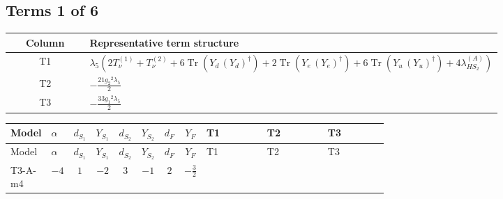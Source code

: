 \documentclass[8pt]{article}
\begin{document}
\begin{landscape}
\subsection*{Terms 1 of 6}
\begin{center}
\begin{tabular}{@{}c >{\raggedright\arraybackslash}p{0.82\linewidth}@{}}
\toprule
Column & Representative term structure \\
\midrule
T1 & \(\displaystyle {\lambda_5} (2 T_{\nu}^{(1)}+T_{\nu}^{(2)}+6 \operatorname{Tr}\!\left({Y_d}\,\left({Y_d}\right)^{\dagger}\right)+2 \operatorname{Tr}\!\left({Y_e}\,\left({Y_e}\right)^{\dagger}\right)+6 \operatorname{Tr}\!\left({Y_u}\,\left({Y_u}\right)^{\dagger}\right)+4 {\lambda_{HS_2}^{(A)}})\) \\
\midrule
T2 & \(\displaystyle -\frac{21 {g_2}^2 {\lambda_5}}{2}\) \\
\midrule
T3 & \(\displaystyle -\frac{33 {g_1}^2 {\lambda_5}}{2}\) \\
\midrule
\bottomrule
\end{tabular}
\end{center}
\smallskip
\tiny
\begin{longtable}{@{}llcccccc >{\raggedright\arraybackslash}p{0.21\linewidth} >{\raggedright\arraybackslash}p{0.21\linewidth} >{\raggedright\arraybackslash}p{0.21\linewidth}@{}}
\toprule
Model & $\alpha$ & $d_{S_1}$ & $Y_{S_1}$ & $d_{S_2}$ & $Y_{S_2}$ & $d_F$ & $Y_F$ & T1 & T2 & T3 \\
\midrule
\endfirsthead
\toprule
Model & $\alpha$ & $d_{S_1}$ & $Y_{S_1}$ & $d_{S_2}$ & $Y_{S_2}$ & $d_F$ & $Y_F$ & T1 & T2 & T3 \\
\midrule
\endhead
T3-A-m4 & $-4$ & $1$ & $-2$ & $3$ & $-1$ & $2$ & $-\frac{3}{2}$ & \scriptsize\adjustbox{max width=\linewidth}{$\begin{gathered} {\lambda_5} (2 T_{\nu}^{(1)}+T_{\nu}^{(2)}+6 \operatorname{Tr}\!\left({Y_d}\,\left({Y_d}\right)^{\dagger}\right)+2 \operatorname{Tr}\!\left({Y_e}\,\left({Y_e}\right)^{\dagger}\right)+6 \operatorname{Tr}\!\left({Y_u}\,\left({Y_u}\right)^{\dagger}\right)+4 {\lambda_{HS_2}^{(A)}})\end{gathered}$} & \scriptsize\adjustbox{max width=\linewidth}{$\begin{gathered} -\frac{21 {g_2}^2 {\lambda_5}}{2}\end{gathered}$} & \scriptsize\adjustbox{max width=\linewidth}{$\begin{gathered} -\frac{33 {g_1}^2 {\lambda_5}}{2}\end{gathered}$} \\

\end{longtable}
\end{landscape}
\end{document}

